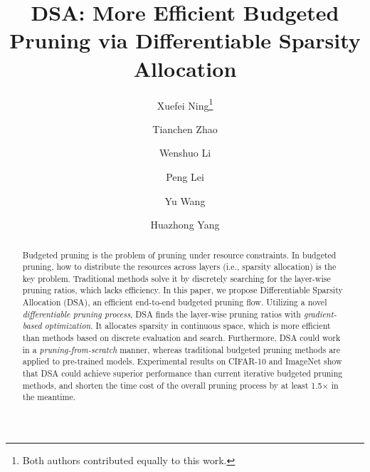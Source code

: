 \documentclass[runningheads]{llncs}
\newcommand{\dsa}{DSA\xspace}
\begin{document}
\pagestyle{headings}
\mainmatter


\title{DSA: More Efficient Budgeted Pruning via Differentiable Sparsity Allocation}



\author{Xuefei Ning\thanks{Both authors contributed equally to this work.} \and
Tianchen Zhao \and
Wenshuo Li \and
Peng Lei \and
Yu Wang \and
Huazhong Yang}




\maketitle
\begin{abstract}

  Budgeted pruning is the problem of pruning under resource constraints. In budgeted pruning, how to distribute the resources across layers (i.e., sparsity allocation) is the key problem. Traditional methods solve it by discretely searching for the layer-wise pruning ratios, which lacks efficiency. In this paper, we propose Differentiable Sparsity Allocation (\dsa), an efficient end-to-end budgeted pruning flow. 
  Utilizing a novel \textit{differentiable pruning process}, DSA finds the layer-wise pruning ratios with \textit{gradient-based optimization}. It allocates sparsity  in continuous space, which is more efficient than methods based on discrete evaluation and search. 
  Furthermore, DSA could work in a \textit{pruning-from-scratch} manner, whereas traditional budgeted pruning methods are applied to pre-trained models. 
  Experimental results on CIFAR-10 and ImageNet show that DSA could achieve superior performance than current iterative budgeted pruning methods, and shorten the time cost of the overall pruning process by at least 1.5$\times$ in the meantime.
  
  
  \end{abstract}
  
\end{document}
